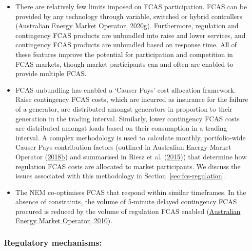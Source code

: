 \documentclass[12pt,a4paper,]{report}
\providecommand{\tightlist}{%
  \setlength{\itemsep}{0pt}\setlength{\parskip}{0pt}}
\begin{document}
\begin{itemize}
\tightlist
\item
  There are relatively few limits imposed on FCAS participation. FCAS
  can be provided by any technology through variable, switched or hybrid
  controllers
  (\protect\hyperlink{ref-australianenergymarketoperatorMarketAncillaryService2020a}{Australian
  Energy Market Operator, 2020g}). Furthermore, regulation and
  contingency FCAS products are unbundled into raise and lower services,
  and contingency FCAS products are unbundled based on response time.
  All of these features improve the potential for participation and
  competition in FCAS markets, though market participants can and often
  are enabled to provide multiple FCAS.
\item
  FCAS unbundling has enabled a `Causer Pays' cost allocation framework.
  Raise contingency FCAS costs, which are incurred as insurance for the
  failure of a generator, are distributed amongst generators in
  proportion to their generation in the trading interval. Similarly,
  lower contingency FCAS costs are distributed amongst loads based on
  their consumption in a trading interval. A complex methodology is used
  to calculate monthly, portfolio-wide Causer Pays contribution factors
  (outlined in Australian Energy Market Operator
  (\protect\hyperlink{ref-australianenergymarketoperatorRegulationFCASContribution2018a}{2018b})
  and summarised in Riesz et al.
  (\protect\hyperlink{ref-rieszFrequencyControlAncillary2015}{2015}))
  that determine how regulation FCAS costs are allocated to market
  participants. We discuss the issues associated with this methodology
  in Section~\ref{sec:fcs-regulation}.
\item
  The NEM co-optimises FCAS that respond within similar timeframes. In
  the absence of constraints, the volume of 5-minute delayed contingency
  FCAS procured is reduced by the volume of regulation FCAS enabled
  (\protect\hyperlink{ref-australianenergymarketoperatorConstraintFormulationGuidelines2010}{Australian
  Energy Market Operator, 2010}).
\end{itemize}

\hypertarget{regulatory-mechanisms}{%
\subsubsection{Regulatory mechanisms:}\label{regulatory-mechanisms}}
\end{document}

